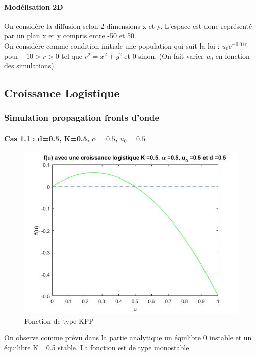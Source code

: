 \documentclass[a4paper,11pt]{article}
\begin{document}
\paragraph{Modélisation 2D}
On considère la diffusion selon 2 dimensions x et y. L'espace est donc représenté par un plan x et y compris entre -50 et 50.\\
On considère comme condition initiale une population qui suit la loi : $u_0 e^{-0.01 r}$ pour $-10 >r>0$ tel que $r^2=x^2+y^2$ et 0 sinon. (On fait varier $u_0$ en fonction des simulations).



\subsection{Croissance Logistique}
\subsubsection{Simulation propagation fronts d'onde}
\paragraph{Cas 1.1 : d=0.5, K=0.5, $\alpha =0.5$, $u_0=0.5$}
\noindent
\begin{figure}[H]
	\centering
	\includegraphics[width=0.45\linewidth]{SimulationKPP/figures1/fu}\hfill
	\caption{Fonction de type KPP}
\end{figure}
\noindent

On observe comme prévu dans la partie analytique un équilibre 0 instable et un équilibre K= 0.5 stable. La fonction est de type monostable.
\end{document}
